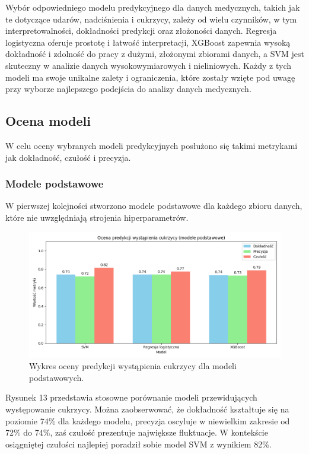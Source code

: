 \documentclass[onecolumn,12pt]{article}
\begin{document}
\noindent
Wybór odpowiedniego modelu predykcyjnego dla danych medycznych, takich jak te dotyczące udarów, nadciśnienia i cukrzycy, zależy od wielu czynników, w tym interpretowalności, dokładności predykcji oraz złożoności danych. Regresja logistyczna oferuje prostotę i łatwość interpretacji, XGBoost zapewnia wysoką dokładność i zdolność do pracy z dużymi, złożonymi zbiorami danych, a SVM jest skuteczny w analizie danych wysokowymiarowych i nieliniowych. Każdy z tych modeli ma swoje unikalne zalety i ograniczenia, które zostały wzięte pod uwagę przy wyborze najlepszego podejścia do analizy danych medycznych.

\subsection{Ocena modeli}
\noindent
W celu oceny wybranych modeli predykcyjnych posłużono się takimi metrykami jak dokładność, czułość i precyzja.
\subsubsection{Modele podstawowe}
\noindent
W pierwszej kolejności stworzono modele podstawowe dla każdego zbioru danych, które nie uwzględniają strojenia hiperparametrów. 

\begin{figure}[H]
    \centering
    \includegraphics[width=0.90\linewidth]{raport/graphs/cukrzyca_przed.png}
    \captionsetup{justification=centering}
    \caption{Wykres oceny predykcji wystąpienia cukrzycy dla modeli podstawowych.}
\end{figure}

\noindent
Rysunek 13 przedstawia stosowne porównanie modeli przewidujących występowanie cukrzycy. Można zaobserwować, że dokładność kształtuje się na poziomie 74\% dla każdego modelu, precyzja oscyluje w niewielkim zakresie od 72\% do 74\%, zaś czułość prezentuje największe fluktuacje. W kontekście osiągniętej czułości najlepiej poradził sobie model SVM z wynikiem 82\%. 
\end{document}
